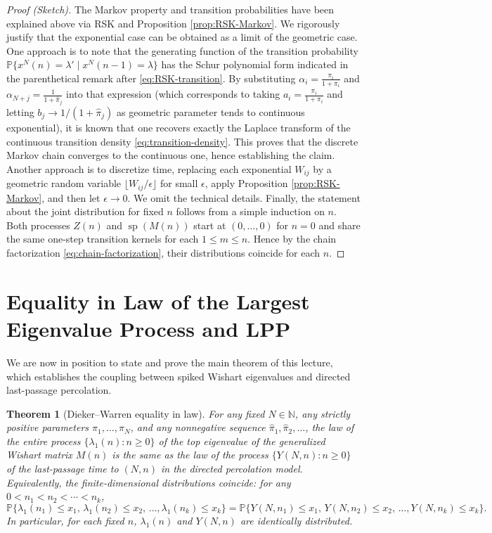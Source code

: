 \documentclass[letterpaper,11pt,oneside,reqno]{article}
\numberwithin{equation}{section}
\newtheorem{theorem}[proposition]{Theorem}
\theoremstyle{definition}
\begin{document}
\begin{proof}[Proof (Sketch)]
The Markov property and transition probabilities have been explained above via RSK and Proposition \ref{prop:RSK-Markov}. We rigorously justify that the exponential case can be obtained as a limit of the geometric case. One approach is to note that the generating function of the transition probability $\mathbb{P}\{x^N(n)=\lambda' \mid x^N(n-1)=\lambda\}$ has the Schur polynomial form indicated in the parenthetical remark after \eqref{eq:RSK-transition}. By substituting $\alpha_i = \frac{\pi_i}{1+\pi_i}$ and $\alpha_{N+j} = \frac{1}{1+\hat\pi_j}$ into that expression (which corresponds to taking $a_i = \frac{\pi_i}{1+\pi_i}$ and letting $b_j\to 1/(1+\hat\pi_j)$ as geometric parameter tends to continuous exponential), it is known \cite[Eq.~(4.2)]{diekerWarren2008determinantal} that one recovers exactly the Laplace transform of the continuous transition density \eqref{eq:transition-density}. This proves that the discrete Markov chain converges to the continuous one, hence establishing the claim. Another approach is to discretize time, replacing each exponential $W_{ij}$ by a geometric random variable $\lfloor W_{ij}/\epsilon \rfloor$ for small $\epsilon$, apply Proposition \ref{prop:RSK-Markov}, and then let $\epsilon\to0$. We omit the technical details. Finally, the statement about the joint distribution for fixed $n$ follows from a simple induction on $n$. Both processes $Z(n)$ and $\operatorname{sp}(M(n))$ start at $(0,\dots,0)$ for $n=0$ and share the same one-step transition kernels for each $1\le m\le n$. Hence by the chain factorization \eqref{eq:chain-factorization}, their distributions coincide for each $n$.
\end{proof}

\section{Equality in Law of the Largest Eigenvalue Process and LPP}
We are now in position to state and prove the main theorem of this lecture, which establishes the coupling between spiked Wishart eigenvalues and directed last-passage percolation.

\begin{theorem}[Dieker--Warren \cite{diekerWarren2008determinantal} equality in law]\label{thm:MainEquality}
For any fixed $N\in \mathbb{N}$, any strictly positive parameters $\pi_1,\dots,\pi_N$, and any nonnegative sequence $\hat\pi_1,\hat\pi_2,\dots$, the law of the entire process $\{\lambda_1(n): n\ge0\}$ of the top eigenvalue of the generalized Wishart matrix $M(n)$ is the same as the law of the process $\{Y(N,n): n\ge0\}$ of the last-passage time to $(N,n)$ in the directed percolation model. Equivalently, the finite-dimensional distributions coincide: for any $0<n_1<n_2<\cdots<n_k$,
\[ \mathbb{P}\{\lambda_1(n_1)\le x_1,\, \lambda_1(n_2)\le x_2,\,\dots, \lambda_1(n_k)\le x_k \} = \mathbb{P}\{Y(N,n_1)\le x_1,\, Y(N,n_2)\le x_2,\,\dots, Y(N,n_k)\le x_k \}. \]
In particular, for each fixed $n$, $\lambda_1(n)$ and $Y(N,n)$ are identically distributed.
\end{theorem}
\end{document}
